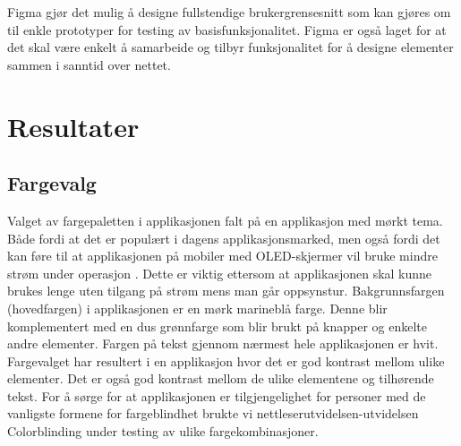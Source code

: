 \noindent
Figma gjør det mulig å designe fullstendige brukergrensesnitt som kan gjøres om til enkle prototyper for testing av basisfunksjonalitet. Figma er også laget for at det skal være enkelt å samarbeide og tilbyr funksjonalitet for å designe elementer sammen i sanntid over nettet.

\section{Resultater}
\subsection{Fargevalg}
Valget av fargepaletten i applikasjonen falt på en applikasjon med mørkt tema. Både fordi at det er populært i dagens applikasjonsmarked, men også fordi det kan føre til at applikasjonen på mobiler med OLED-skjermer \cite{OLEDOLED-Info} vil bruke mindre strøm under operasjon \cite{WhatEnerlytics}. Dette er viktig ettersom at applikasjonen skal kunne brukes lenge uten tilgang på strøm mens man går oppsynstur. Bakgrunnsfargen (hovedfargen) i applikasjonen er en mørk marineblå farge. Denne blir komplementert med en dus grønnfarge som blir brukt på knapper og enkelte andre elementer. Fargen på tekst gjennom nærmest hele applikasjonen er hvit. Fargevalget har resultert i en applikasjon hvor det er god kontrast mellom ulike elementer. Det er også god kontrast mellom de ulike elementene og tilhørende tekst. For å sørge for at applikasjonen er tilgjengelighet for personer med de vanligste formene for fargeblindhet brukte vi nettleserutvidelsen-utvidelsen Colorblinding \cite{LeonardoCardoso/Colorblinding:See.} under testing av ulike fargekombinasjoner.


